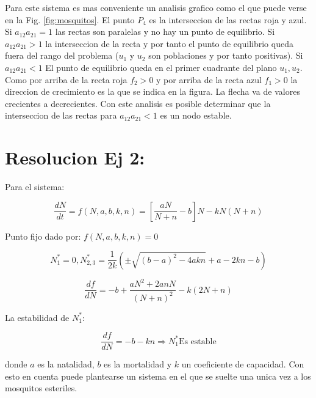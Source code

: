 \documentclass[twocolumn,aps,prl]{revtex4-1}
\newcommand{\Nstar}{N^*}
\begin{document}

Para este sistema es mas conveniente un analisis grafico como el que puede verse en la Fig. \ref{fig:mosquitos}. El punto $P_4$ es la interseccion de las rectas roja y azul. Si $a_{12} a_{21} = 1$ las rectas son paralelas y no hay un punto de equilibrio. Si $a_{12} a_{21} > 1$ la interseccion de la recta y por tanto el punto de equilibrio queda fuera del rango del problema ($u_1$ y $u_2$ son poblaciones y por tanto positivas). Si $a_{12} a_{21} < 1$ El punto de equilibrio queda en el primer cuadrante del plano $u_1, u_2$. Como por arriba de la recta roja $f_2>0$ y por arriba de la recta azul $f_1>0$ la direccion de crecimiento es la que se indica en la figura. La flecha va de valores crecientes a decrecientes. Con este analisis es posible determinar que la interseccion de las rectas para $a_{12} a_{21} < 1$ es un nodo estable.

% 

\section{Resolucion Ej 2:}

Para el sistema:

\begin{equation}
    \frac{d N}{d t} = f(N,a,b,k,n) 
    = \left[\frac{a N}{N+n}-b\right] N- k N(N+n)
\end{equation}


Punto fijo dado por: $f(N,a,b,k,n) = 0$

$$
\Nstar_1 = 0, 
\Nstar_{2,3} = \frac{1}{2k} 
\left( 
    \pm \sqrt{(b-a)^2 - 4 a k n} + 
    a - 2kn - b
\right)
$$


$$
\frac{d f}{d N} = - b + \frac{ aN^2 + 2 a n N}{( N + n )^2}
- k (2N + n)
$$

La estabilidad de $\Nstar_1$:

$$
\frac{d f}{d N} = - b - k  n \Rightarrow  \Nstar_1 \text{Es estable}
$$



donde $a$ es la natalidad, $b$ es la mortalidad y $k$ un coeficiente de capacidad. Con esto en cuenta puede plantearse un sistema en el que se suelte una unica vez a los mosquitos esteriles.
\end{document}
